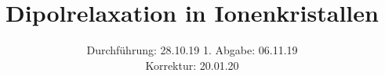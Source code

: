 
\setlength{\parindent}{0 pt}

\subject{V48}
\title{Dipolrelaxation in Ionenkristallen}
\date{%
  Durchführung: 28.10.19
  \hspace{3em}
  1. Abgabe: 06.11.19 \\
  Korrektur: 20.01.20
}



\maketitle
\thispagestyle{empty}
\tableofcontents
\newpage






\printbibliography{}


